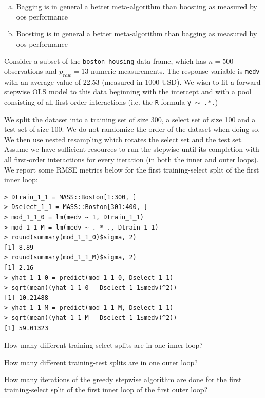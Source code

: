 \documentclass[12pt]{article}
\begin{document}
\begin{enumerate}[(a)]
\item Bagging is in general a better meta-algorithm than boosting as measured by oos performance
\item Boosting is in general a better meta-algorithm than bagging as measured by oos performance
\end{enumerate}

\eenum

\problem Consider a subset of the \texttt{boston housing} data frame, which has $n = 500$ observations and $p_{raw} = 13$ numeric measurements. The response variable is \texttt{medv} with an average value of 22.53 (measured in 1000 USD). We wish to fit a forward stepwise OLS model to this data beginning with the intercept and with a pool consisting of all first-order interactions (i.e. the \texttt{R} formula \texttt{y $\sim$ .*.}) 

We split the dataset into a training set of size 300, a select set of size 100 and a test set of size 100. We do not randomize the order of the dataset when doing so. We then use nested resampling which rotates the select set and the test set. Assume we have sufficient resources to run the stepwise until its completion with all first-order interactions for every iteration (in both the inner and outer loops). We report some RMSE metrics below for the first training-select split of the first inner loop:

\begin{Verbatim}[frame=single]
> Dtrain_1_1 = MASS::Boston[1:300, ]
> Dselect_1_1 = MASS::Boston[301:400, ]
> mod_1_1_0 = lm(medv ~ 1, Dtrain_1_1)
> mod_1_1_M = lm(medv ~ . * ., Dtrain_1_1)
> round(summary(mod_1_1_0)$sigma, 2)
[1] 8.89
> round(summary(mod_1_1_M)$sigma, 2)
[1] 2.16
> yhat_1_1_0 = predict(mod_1_1_0, Dselect_1_1)
> sqrt(mean((yhat_1_1_0 - Dselect_1_1$medv)^2))
[1] 10.21488
> yhat_1_1_M = predict(mod_1_1_M, Dselect_1_1)
> sqrt(mean((yhat_1_1_M - Dselect_1_1$medv)^2))
[1] 59.01323
\end{Verbatim}

\benum

 How many different training-select splits are in one inner loop?

 How many different training-test splits are in one outer loop?


 How many iterations of the greedy stepwise algorithm are done for the first training-select split of the first inner loop of the first outer loop?
\end{document}
